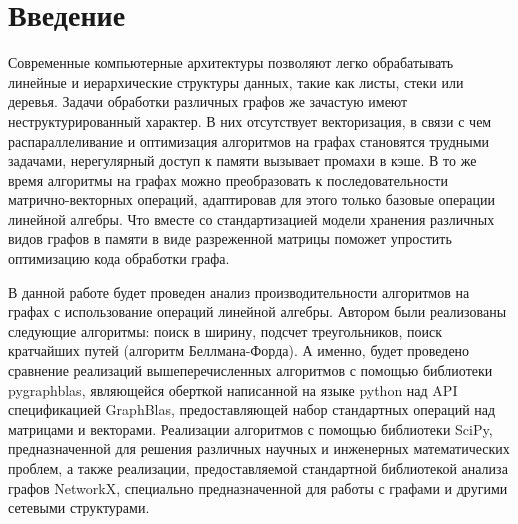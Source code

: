 \section{Введение}

Современные компьютерные архитектуры позволяют легко обрабатывать линейные и иерархические структуры данных, 
такие как листы, стеки или деревья. Задачи обработки различных графов же зачастую имеют неструктурированный характер. 
В них отсутствует векторизация, в связи с чем распараллеливание и оптимизация алгоритмов на графах становятся трудными задачами, 
нерегулярный доступ к памяти вызывает промахи в кэше. В то же время алгоритмы на графах можно преобразовать к последовательности 
матрично-векторных операций, адаптировав для этого только базовые операции линейной алгебры. Что вместе со стандартизацией модели 
хранения различных видов графов в памяти в виде разреженной матрицы поможет упростить оптимизацию кода обработки графа.

В данной работе будет проведен анализ производительности алгоритмов на графах с использование
операций линейной алгебры. Автором были реализованы следующие алгоритмы: поиск в ширину, подсчет
треугольников, поиск кратчайших путей (алгоритм Беллмана-Форда). А именно, будет проведено
сравнение реализаций вышеперечисленных алгоритмов с помощью библиотеки pygraphblas, являющейся оберткой написанной на языке python 
над API спецификацией GraphBlas, предоставляющей набор стандартных операций над матрицами и векторами. Реализации алгоритмов с 
помощью библиотеки SciPy, предназначенной для решения различных научных и инженерных математических проблем, а также реализации, 
предоставляемой стандартной библиотекой анализа графов NetworkX, специально предназначенной для работы с графами и другими сетевыми 
структурами.


